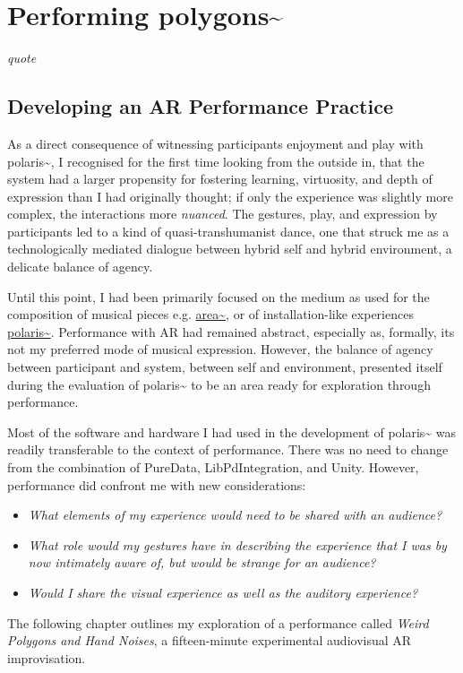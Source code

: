 \chapter{Performing polygons\textasciitilde{}}
\label{sec: performance}
\epigraph{\emph{quote}}{\citep[]{bilbow2022}}
\section{Developing an AR Performance Practice} \label{sec: performance-developing}
As a direct consequence of witnessing participants enjoyment and play with polaris\textasciitilde{}, I recognised for the first time looking from the outside in, that the system had a larger propensity for fostering learning, virtuosity, and depth of expression than I had originally thought; if only the experience was slightly more complex, the interactions more \textit{nuanced}. The gestures, play, and expression by participants led to a kind of quasi-transhumanist dance, one that struck me as a technologically mediated dialogue between hybrid self and hybrid environment, a delicate balance of agency.

Until this point, I had been primarily focused on the medium as used for the composition of musical pieces e.g. \hyperref[sec: area]{area\textasciitilde{}}, or of installation-like experiences \hyperref[sec: polaris]{polaris\textasciitilde{}}. Performance with AR had remained abstract, especially as, formally, its not my preferred mode of musical expression. However, the balance of agency between participant and system, between self and environment, presented itself during the evaluation of polaris\textasciitilde{} to be an area ready for exploration through performance. 

Most of the software and hardware I had used in the development of polaris\textasciitilde{} was readily transferable to the context of performance. There was no need to change from the combination of PureData, LibPdIntegration, and Unity. However, performance did confront me with new considerations: 
\begin{itemize}
    \item \textit{What elements of my experience would need to be shared with an audience?} 
    \item \textit{What role would my gestures have in describing the experience that I was by now intimately aware of, but would be strange for an audience?} 
    \item \textit{Would I share the visual experience as well as the auditory experience?} 
\end{itemize}
The following chapter outlines my exploration of a performance called \textit{Weird Polygons and Hand Noises}, a fifteen-minute experimental audiovisual AR improvisation.



